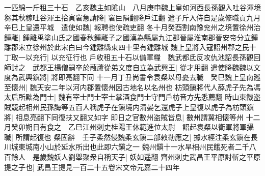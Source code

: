一匹綿一斤租三十石　乙亥魏主如隂山　八月庚申魏上皇如河西長孫觀入吐谷渾境芻其秋稼吐谷渾王拾寅窘急請降|{
	窘巨隕翻降戶江翻}
遣子斤入侍自是歲修職貢九月辛巳上皇還平城　遣使如魏|{
	報聘也使疏吏翻}
冬十月癸酉割南豫兖州之境置徐州治鍾離|{
	鍾離禹塗山氏之國春秋鍾離子之國漢為縣屬九江郡晉屬淮南郡晉安帝分立鍾離郡宋立徐州於此宋白曰今鍾離縣東四十里有鍾離城}
魏上皇將入寇詔州郡之民十丁取一以充行|{
	以充征行也}
戶收租五十石以備軍糧　魏武都氐反攻仇池詔長孫觀回師討之　武都王楊僧嗣卒於葭蘆從弟文度自立為武興王|{
	從才用翻}
遣使降魏魏以文度為武興鎭將|{
	將即亮翻下同}
十一月丁丑尚書令袁粲以母憂去職　癸巳魏上皇南廵至懷州|{
	魏天安二年以河内郡置懷州因古地名以名州也}
枋頭鎭將代人薛虎子先為馮太后所黜為門士|{
	魏有宰士門士宰士掌酒食門士守門戶枋音方先悉薦翻}
時山東饑盗賊競起相州民孫誨等五百人稱虎子在鎭境内清晏乞還虎子上皇復以虎子為枋頭鎭將|{
	相息亮翻下同復扶又翻又如字}
即日之官數州盗賊皆息|{
	數州謂冀相懷等州}
十二月癸卯朔日有食之　乙巳江州刺史桂陽王休範進位太尉　詔起袁粲以衛軍將軍攝職|{
	所謂起復也}
粲固辭　壬子柔然侵魏柔玄鎭二部敕勒應之|{
	據水經注柔玄鎭在長川城東城南小山於延水所出也此即六鎭之一}
魏州鎭十一水旱相州民餓死者二千八百餘人　是歲魏妖人劉舉聚衆自稱天子|{
	妖如遥翻}
齊州刺史武昌王平原討斬之平原提之子也|{
	武昌王提見一百二十五卷宋文帝元嘉二十四年}


